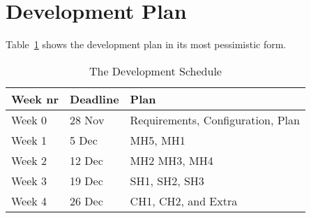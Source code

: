 \documentclass{scrartcl}
\begin{document}
\section{Development Plan}
Table~\ref{tab:plan} shows the development plan in its most pessimistic form.
\begin{table}[hb]
	\centering
	\begin{tabular}{|l|l|l|}
		\hline
		Week nr & Deadline & Plan \\\hline
		Week 0 & 28 Nov & Requirements, Configuration, Plan \\\hline
		Week 1 & 5 Dec & MH5, MH1 \\\hline
		Week 2 & 12 Dec & MH2 MH3, MH4 \\\hline
		Week 3 & 19 Dec & SH1, SH2, SH3 \\\hline
		Week 4 & 26 Dec & CH1, CH2, and Extra \\\hline
	\end{tabular}
	\caption{The Development Schedule}
	\label{tab:plan}
\end{table}
\end{document}

